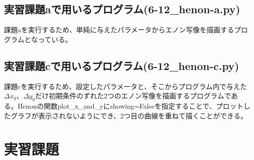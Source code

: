 \documentclass{jsarticle}
\begin{document}
        \subsection{実習課題aで用いるプログラム(6-12\_henon-a.py)}
            課題aを実行するため、単純に与えたパラメータからエノン写像を描画するプログラムとなっている。
        
        \subsection{実習課題cで用いるプログラム(6-12\_henon-c.py)}
        課題cを実行するため、設定したパラメータと、そこからプログラム内で与えた$\Delta x_{0}$、$\Delta y_{0}$だけ初期条件のずれた2つのエノン写像を描画するプログラムである。Henonの関数plot\_x\_and\_yにshowing=Falseを指定することで、プロットしたグラフが表示されないようにでき、2つ目の曲線を重ねて描くことができる。
        
    \section{実習課題}
    
\end{document}

